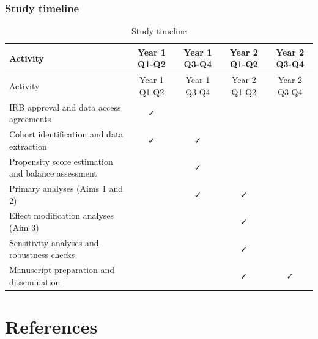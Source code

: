 \documentclass[
]{agujournal2019}
\begin{document}
\subsubsection{Study timeline}\label{study-timeline}

\begin{longtable}[]{@{}lcccc@{}}
\caption{Study timeline}\label{tbl-timeline}\tabularnewline
\toprule\noalign{}
Activity & Year 1 Q1-Q2 & Year 1 Q3-Q4 & Year 2 Q1-Q2 & Year 2 Q3-Q4 \\
\midrule\noalign{}
\endfirsthead
\toprule\noalign{}
Activity & Year 1 Q1-Q2 & Year 1 Q3-Q4 & Year 2 Q1-Q2 & Year 2 Q3-Q4 \\
\midrule\noalign{}
\endhead
\bottomrule\noalign{}
\endlastfoot
IRB approval and data access agreements & ✓ & & & \\
Cohort identification and data extraction & ✓ & ✓ & & \\
Propensity score estimation and balance assessment & & ✓ & & \\
Primary analyses (Aims 1 and 2) & & ✓ & ✓ & \\
Effect modification analyses (Aim 3) & & & ✓ & \\
Sensitivity analyses and robustness checks & & & ✓ & \\
Manuscript preparation and dissemination & & & ✓ & ✓ \\
\end{longtable}

\newpage{}

\section{References}\label{references}
\end{document}

